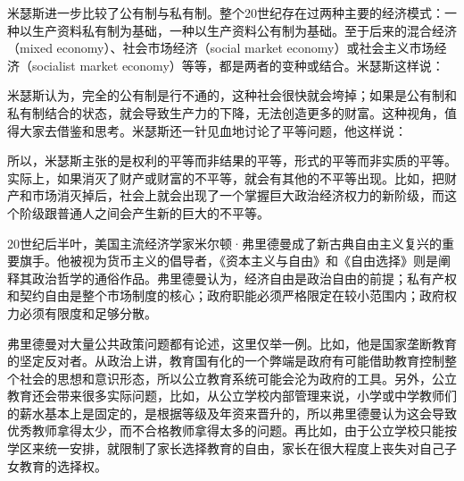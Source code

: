 米瑟斯进一步比较了公有制与私有制。整个20世纪存在过两种主要的经济模式：一种以生产资料私有制为基础，一种以生产资料公有制为基础。至于后来的混合经济（mixed economy）、社会市场经济（social market economy）或社会主义市场经济（socialist market economy）等等，都是两者的变种或结合。米瑟斯这样说：


米瑟斯认为，完全的公有制是行不通的，这种社会很快就会垮掉；如果是公有制和私有制结合的状态，就会导致生产力的下降，无法创造更多的财富。这种视角，值得大家去借鉴和思考。米瑟斯还一针见血地讨论了平等问题，他这样说：


所以，米瑟斯主张的是权利的平等而非结果的平等，形式的平等而非实质的平等。实际上，如果消灭了财产或财富的不平等，就会有其他的不平等出现。比如，把财产和市场消灭掉后，社会上就会出现了一个掌握巨大政治经济权力的新阶级，而这个阶级跟普通人之间会产生新的巨大的不平等。

20世纪后半叶，美国主流经济学家米尔顿·弗里德曼成了新古典自由主义复兴的重要旗手。他被视为货币主义的倡导者，《资本主义与自由》和《自由选择》则是阐释其政治哲学的通俗作品。弗里德曼认为，经济自由是政治自由的前提；私有产权和契约自由是整个市场制度的核心；政府职能必须严格限定在较小范围内；政府权力必须有限度和足够分散。

弗里德曼对大量公共政策问题都有论述，这里仅举一例。比如，他是国家垄断教育的坚定反对者。从政治上讲，教育国有化的一个弊端是政府有可能借助教育控制整个社会的思想和意识形态，所以公立教育系统可能会沦为政府的工具。另外，公立教育还会带来很多实际问题，比如，从公立学校内部管理来说，小学或中学教师们的薪水基本上是固定的，是根据等级及年资来晋升的，所以弗里德曼认为这会导致优秀教师拿得太少，而不合格教师拿得太多的问题。再比如，由于公立学校只能按学区来统一安排，就限制了家长选择教育的自由，家长在很大程度上丧失对自己子女教育的选择权。

